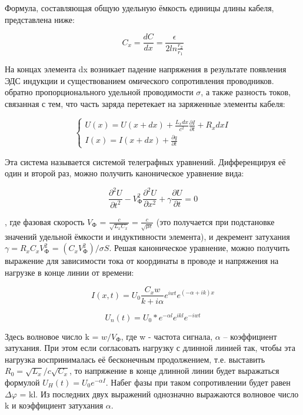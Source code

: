 \documentclass[a4paper,12pt]{article} %
\begin{document}
Формула, составляющая общую удельную ёмкость единицы длины кабеля, представлена ниже: 

\begin{equation}
    C_x = \frac{dC}{dx} = \frac{\epsilon}{2ln\frac{r_2}{r_1}}
\end{equation}

На концах элемента dx возникает падение напряжения в результате появления ЭДС индукции и существованием омического сопротивления проводников. обратно пропорционального удельной проводимости $\sigma$, а также разность токов, связанная с тем, что часть заряда перетекает на заряженные элементы кабеля:

\begin{equation}
\begin{cases}
    U(x) = U(x+dx)+\frac{L_xdx}{c^2}\frac{\partial I}{\partial t} + R_xdxI\\
    I(x) = I(x+dx)+\frac{\partial q}{\partial t}
\end{cases}
\end{equation}

Эта система называется системой телеграфных уравнений. Дифференцируя её один и второй раз, можно получить каноническое уравнение вида:

\begin{equation}
    \frac{\partial^2 U}{\partial t^2} - V_\text{Ф}^2 \frac{\partial^2 U}{\partial x^2} + \gamma \frac{\partial U}{\partial t} = 0
\end{equation}

, где фазовая скорость $V_\text{Ф}$ = $\frac{c}{\sqrt{L_xC_x}} = \frac{c}{\sqrt{\mu \epsilon}}$ (это получается при подстановке значений удельной ёмкости и индуктивности элемента), и декремент затухания $\gamma = R_xC_xV_\text{Ф}^2$ = $(C_xV_\text{Ф}^2)/\sigma S$. Решая каноническое уравнение, можно получить выражение для зависимости тока от координаты в проводе и напряжения на нагрузке в конце линии от времени:

\begin{equation}
    I(x, t) = U_0 \frac{C_xw}{k+i\alpha}e^{iwt}e^{(-\alpha + ik)x}
\end{equation}

\begin{equation}
    U_n(t) = U_0*e^{-\alpha l}e^{ikl}e^{-iwt}
\end{equation}

Здесь волновое число k = $w / V_\text{Ф}$, где w - частота сигнала, $\alpha$ – коэффициент затухания. При этом если согласовать нагрузку с длинной линией так, чтобы эта нагрузка воспринималась её бесконечным продолжением, т.е. выставить $R_0 = \sqrt{L_x} / c\sqrt{C_x}$, то напряжение в конце длинной линии будет выражаться формулой $U_H(t) = U_0e^{-\alpha I}$. Набег фазы при таком сопротивлении будет равен $\Delta \varphi$ = kl. Из последних двух выражений однозначно выражаются волновое число k и коэффициент затухания $\alpha$. 
\end{document}
